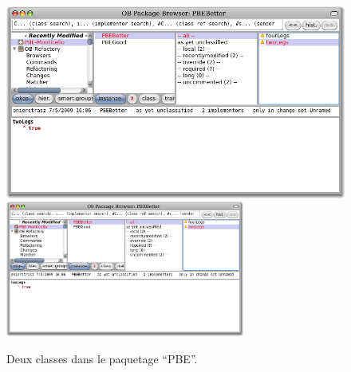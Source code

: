\documentclass[a4paper,10pt,twoside]{book}
\begin{document}
\begin{figure}[btp]
	\begin{center}
	\ifluluelse
		{\includegraphics[width=\textwidth]{MCnewcategory}}
		{\includegraphics[width=0.7\textwidth]{MCnewcategory}}
	\end{center}
	\caption{Deux classes dans le paquetage ``PBE''.}
\end{figure}
\end{document}
